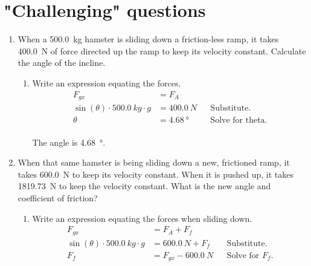 \documentclass[letterpaper, 12pt]{report}
\begin{document}
\section*{"Challenging" questions}
\begin{enumerate}
    \item When a \SI{500.0}{kg} hamster is sliding down a friction-less ramp, it takes \SI{400.0}{N} of force directed up the ramp to keep its velocity constant. Calculate the angle of the incline.
    
    \begin{enumerate}
        \item Write an expression equating the forces.
            \begin{align}
                F_{gx} &= F_A && \\
                \sin(\theta) \cdot \SI{500.0}{kg} \cdot g &= \SI{400.0}{N} && \text{Substitute.} \\
                \theta &= \SI{4.68}{\degree} && \text{Solve for theta.}
            \end{align}
            \hfill
                    \\
                    The angle is \SI{4.68}{\degree}. \\
    \end{enumerate}
    
    \item When that same hamster is being sliding down a new, frictioned ramp, it takes \SI{600.0}{N} to keep its velocity constant. When it is pushed up, it takes \SI{1819.73}{N} to keep the velocity constant. What is the new angle and coefficient of friction?
    \begin{enumerate}
        \item Write an expression equating the forces when sliding down.
        \begin{align}
                F_{gx} &= F_A + F_f && \\
                \sin(\theta) \cdot \SI{500.0}{kg} \cdot g &= \SI{600.0}{N} + F_f && \text{Substitute.} \\
                F_f &= F_{gx} - \SI{600.0}{N} && \text{Solve for } F_f \text{.}
            \end{align}
            

\end{enumerate}
\end{enumerate}
\end{document}
